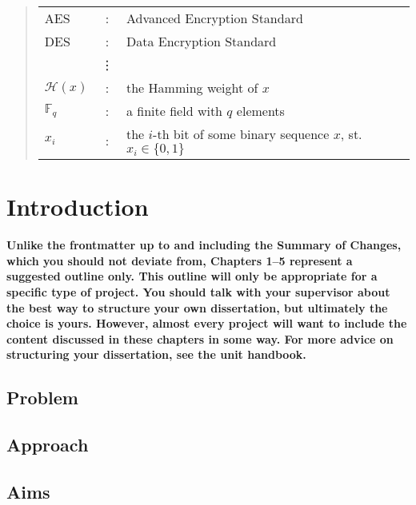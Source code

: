 \documentclass[oneside,%
                    author={Malak Hajji},
                    degree={BSc},
                    title={Designing An Accessible Computational Toolkit For Students},
                  subtitle={With Mixed Visual Abilities}]{dissertation}
\begin{document}
\begin{quote}
\noindent
\begin{tabular}{lcl}
AES                 &:     & Advanced Encryption Standard                                         \\
DES                 &:     & Data Encryption Standard                                             \\
                    &\vdots&                                                                      \\
${\mathcal H}( x )$ &:     & the Hamming weight of $x$                                            \\
${\mathbb  F}_q$    &:     & a finite field with $q$ elements                                     \\
$x_i$               &:     & the $i$-th bit of some binary sequence $x$, st. $x_i \in \{ 0, 1 \}$ \\
\end{tabular}
\end{quote}



\chapter{Introduction}
\label{chap:context}

{\bf Unlike the frontmatter up to and including the Summary of Changes, which you should not deviate from, Chapters 1--5 represent a suggested outline only. This outline will only be appropriate for a specific type of project. You should talk with your supervisor about the best way to structure your own dissertation, but ultimately the choice is yours. However, almost every project will want to include the content discussed in these chapters in some way. For more advice on structuring your dissertation, see the unit handbook.}
\vspace{1cm} 
\section{Problem}
\section{Approach}
\section{Aims}
\end{document}
